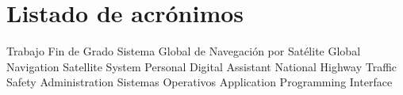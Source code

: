 \chapter{Listado de acrónimos}

{\small
\begin{acronym}[XXXXXXXX]
       {Trabajo Fin de Grado}
      {Sistema Global de Navegación por Satélite}
      {Global Navigation Satellite System}
       {Personal Digital Assistant}
     {National Highway Traffic Safety Administration}
        {Sistemas Operativos}
       {Application Programming Interface}
\end{acronym}
}




